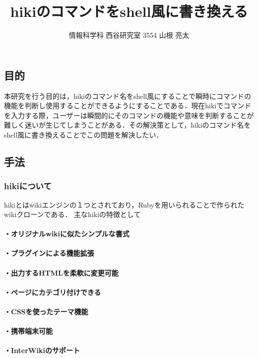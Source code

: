 \documentclass[a4j,twocolumn]{jsarticle}
\begin{document}
\title{hikiのコマンドをshell風に書き換える}
\author{情報科学科 西谷研究室 3554 山根 亮太}
\date{}
\maketitle
\subsection{目的}
本研究を行う目的は，hikiのコマンド名をshell風にすることで瞬時にコマンドの機能を判断し使用することができるようにすることである．現在hikiでコマンドを入力する際，ユーザーは瞬間的にそのコマンドの機能や意味を判断することが難しく迷いが生じてしまうことがある．その解決策として，hikiのコマンド名をshell風に書き換えることでこの問題を解決したい．

\subsection{手法}
\subsubsection{hikiについて}
hikiとはwikiエンジンの１つとされており，Rubyを用いられることで作られたwikiクローンである．
主なhikiの特徴として

\paragraph{・オリジナルwikiに似たシンプルな書式}
\paragraph{・プラグインによる機能拡張}
\paragraph{・出力するHTMLを柔軟に変更可能}
\paragraph{・ページにカテゴリ付けできる}
\paragraph{・CSSを使ったテーマ機能}
\paragraph{・携帯端末可能}
\paragraph{・InterWikiのサポート}
\end{document}
